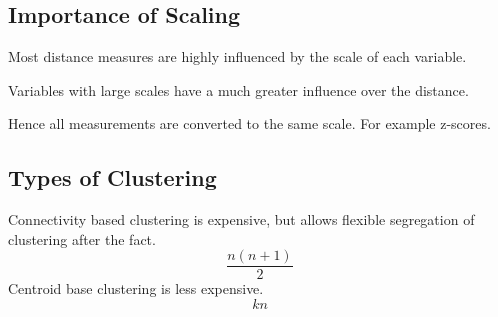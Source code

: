	\subsection{Importance of Scaling}

	\begin{bulletedlist}
		\item Most distance measures are highly influenced by the scale of each variable.
		\item Variables with large scales have a much greater influence over the distance.
		\item Hence all measurements are converted to the same scale.  For example z-scores.
	\end{bulletedlist}

	\subsection{Types of Clustering}
Connectivity based clustering is expensive, but allows flexible segregation of clustering after the fact.
	\begin{displaymath}
		\frac{n(n+1)}{2}
	\end{displaymath}
Centroid base clustering is less expensive.
	\begin{displaymath}
		kn
	\end{displaymath}
	\begin{mathwhere}[0.38in]
	\end{mathwhere}

